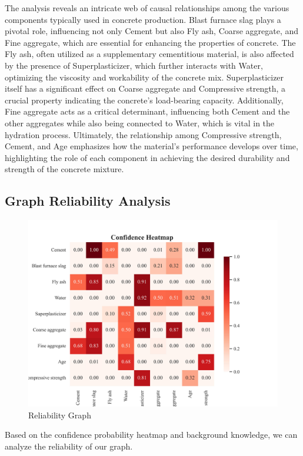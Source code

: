 \documentclass{article}
\begin{document}
The analysis reveals an intricate web of causal relationships among the various components typically used in concrete production. Blast furnace slag plays a pivotal role, influencing not only Cement but also Fly ash, Coarse aggregate, and Fine aggregate, which are essential for enhancing the properties of concrete. The Fly ash, often utilized as a supplementary cementitious material, is also affected by the presence of Superplasticizer, which further interacts with Water, optimizing the viscosity and workability of the concrete mix. Superplasticizer itself has a significant effect on Coarse aggregate and Compressive strength, a crucial property indicating the concrete's load-bearing capacity. Additionally, Fine aggregate acts as a critical determinant, influencing both Cement and the other aggregates while also being connected to Water, which is vital in the hydration process. Ultimately, the relationship among Compressive strength, Cement, and Age emphasizes how the material's performance develops over time, highlighting the role of each component in achieving the desired durability and strength of the concrete mixture.

\subsection{Graph Reliability Analysis}

\begin{figure}[H]
        \centering
        \vspace{-0.5cm}
        \includegraphics[width=0.8\linewidth]{data/dataset/CCS_Data/output_graph/confidence_heatmap.jpg}
        \caption{Reliability Graph}
        \label{fig:sub3}
\end{figure}

Based on the confidence probability heatmap and background knowledge, we can analyze the reliability of our graph.
\end{document}
